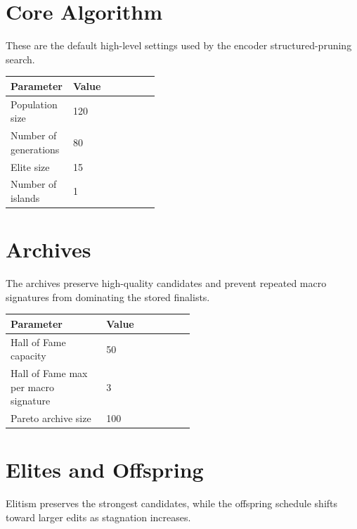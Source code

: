 ﻿\documentclass[10pt,twocolumn]{article}
\newenvironment{hptable}{%
  \begin{tcolorbox}[tablebox]
  \footnotesize
  \renewcommand{\arraystretch}{1.12}
  \setlength{\tabcolsep}{3.0pt}
}{%
  \end{tcolorbox}
}
\begin{document}
\appendix
{}

\section{Core Algorithm}
These are the default high-level settings used by the encoder structured-pruning search.

\begin{hptable}
\begin{tabularx}{\linewidth}{@{}W{0.42\linewidth}Y@{}}
\toprule
\textbf{Parameter} & \textbf{Value} \\
\midrule
Population size & 120 \\
Number of generations & 80 \\
Elite size & 15 \\
Number of islands & 1 \\
\bottomrule
\end{tabularx}
\end{hptable}

\section{Archives}
The archives preserve high-quality candidates and prevent repeated macro signatures from dominating the stored finalists.

\begin{hptable}
\begin{tabularx}{\linewidth}{@{}W{0.52\linewidth}Y@{}}
\toprule
\textbf{Parameter} & \textbf{Value} \\
\midrule
Hall of Fame capacity & 50 \\
Hall of Fame max per macro signature & 3 \\
Pareto archive size & 100 \\
\bottomrule
\end{tabularx}
\end{hptable}

\section{Elites and Offspring}
Elitism preserves the strongest candidates, while the offspring schedule shifts toward larger edits as stagnation increases.
\end{document}
